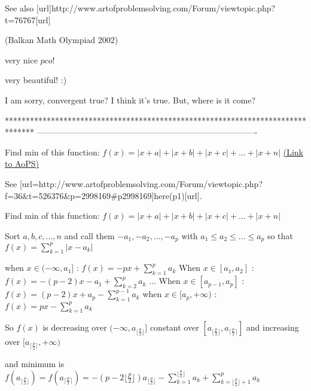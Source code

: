 \begin{solution}
	See also [url]http://www.artofproblemsolving.com/Forum/viewtopic.php?t=76767[\/url]

(Balkan Math Olympiad 2002)
\end{solution}



\begin{solution}
	very nice  $pco$!

very beautiful!
:)

I am sorry,  convergent true?
  I think  it's true.
But,  where is it come?
\end{solution}
*******************************************************************************
-------------------------------------------------------------------------------

\begin{problem}
	Find min of this function: $f(x)=|x+a|+|x+b|+|x+c|+ . . . + |x+n|$
	\flushright \href{https://artofproblemsolving.com/community/c6h534900}{(Link to AoPS)}
\end{problem}



\begin{solution}
	See [url=http://www.artofproblemsolving.com/Forum/viewtopic.php?f=36&t=526376&p=2998169#p2998169]here(p1)[\/url].
\end{solution}



\begin{solution}
	\begin{tcolorbox}Find min of this function: $f(x)=|x+a|+|x+b|+|x+c|+ . . . + |x+n|$\end{tcolorbox}
Sort $a,b,c,...,n$ and call them $-a_1,-a_2,...,-a_p$ with $a_1\le a_2\le ... \le a_p$ so that $f(x)=\sum_{k=1}^p|x-a_k|$

when $x\in(-\infty, a_1]$ : $f(x)=-px+\sum_{k=1}^p a_k$
When $x\in[a_1,a_2]$ : $f(x)=-(p-2)x-a_1+\sum_{k=2}^p a_k$
...
When $x\in[a_{p-1},a_p]$ : $f(x)=(p-2)x+a_p-\sum_{k=1}^{p-1} a_k$
when $x\in[a_p,+\infty)$ : $f(x)=px-\sum_{k=1}^p a_k$

So $f(x)$ is decreasing over $(-\infty,a_{\lfloor\frac p2\rfloor}]$ constant over $[a_{\lfloor\frac p2\rfloor},a_{\lceil\frac p2\rceil}]$ and increasing over $[a_{\lceil\frac p2\rceil},+\infty)$

and minimum is $f(a_{\lfloor\frac p2\rfloor})=f(a_{\lceil\frac p2\rceil})=\boxed{-(p-2\lfloor\frac p2\rfloor)a_{\lfloor\frac p2\rfloor}-\sum_{k=1}^{\lfloor\frac p2\rfloor}a_k+\sum_{k=\lfloor\frac p2\rfloor+1}^pa_k}$
\end{solution}



